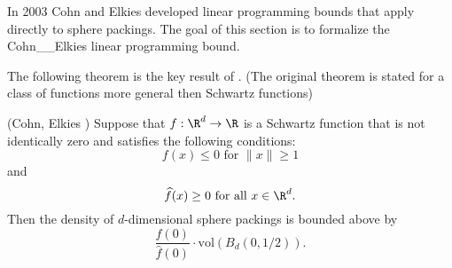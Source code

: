 In 2003 Cohn and Elkies \cite{ElkiesCohn}  developed  linear programming bounds that apply directly to sphere packings. The goal of this section is to formalize the Cohn__Elkies linear programming bound.

The following theorem is the key result of \cite{ElkiesCohn}. (The original theorem is stated for a   class of functions more general then Schwartz functions)
\begin{theorem}\label{thm-Cohn-Elkies}\notready
  (Cohn, Elkies \cite{ElkiesCohn}) Suppose that  $f:\R^d\to\R$ is a Schwartz function that is not identically zero and satisfies the following conditions:
  \begin{equation}\label{eqn-Cohn-Elkies-condition-1}f(x)\leq 0\mbox{ for } \|x\|\geq 1\end{equation} and
  \begin{equation}\label{eqn-Cohn-Elkies-condition-2}\widehat{f}(x)\geq0\mbox{ for all } x\in\R^d.\end{equation}
    Then the density of $d$-dimensional
    sphere packings is bounded above by $$\frac{f(0)}{\widehat{f}(0)}\cdot \mathrm{vol}(B_d(0,1/2)).$$
  \end{theorem}
